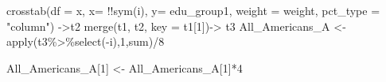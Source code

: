 \documentclass[
]{article}
\newenvironment{Shaded}{\begin{snugshade}}{\end{snugshade}}
\newcommand{\AttributeTok}[1]{\textcolor[rgb]{0.77,0.63,0.00}{#1}}
\newcommand{\DecValTok}[1]{\textcolor[rgb]{0.00,0.00,0.81}{#1}}
\newcommand{\FunctionTok}[1]{\textcolor[rgb]{0.00,0.00,0.00}{#1}}
\newcommand{\NormalTok}[1]{#1}
\newcommand{\OtherTok}[1]{\textcolor[rgb]{0.56,0.35,0.01}{#1}}
\newcommand{\SpecialCharTok}[1]{\textcolor[rgb]{0.00,0.00,0.00}{#1}}
\newcommand{\StringTok}[1]{\textcolor[rgb]{0.31,0.60,0.02}{#1}}
\begin{document}
\begin{Shaded}
\begin{Highlighting}[]
  \FunctionTok{crosstab}\NormalTok{(}\AttributeTok{df =}\NormalTok{ x, }\AttributeTok{x=} \SpecialCharTok{!!}\FunctionTok{sym}\NormalTok{(i), }\AttributeTok{y=}\NormalTok{ edu\_group1, }\AttributeTok{weight =}\NormalTok{ weight, }\AttributeTok{pct\_type =} \StringTok{"column"}\NormalTok{) }\OtherTok{{-}\textgreater{}}\NormalTok{t2}
\FunctionTok{merge}\NormalTok{(t1, t2, }\AttributeTok{key =}\NormalTok{ t1[}\DecValTok{1}\NormalTok{])}\OtherTok{{-}\textgreater{}}\NormalTok{ t3}
\NormalTok{All\_Americans\_A }\OtherTok{\textless{}{-}} \FunctionTok{apply}\NormalTok{(t3}\SpecialCharTok{\%\textgreater{}\%}\FunctionTok{select}\NormalTok{(}\SpecialCharTok{{-}}\NormalTok{i),}\DecValTok{1}\NormalTok{,sum)}\SpecialCharTok{/}\DecValTok{8}

\NormalTok{All\_Americans\_A[}\DecValTok{1}\NormalTok{] }\OtherTok{\textless{}{-}}\NormalTok{ All\_Americans\_A[}\DecValTok{1}\NormalTok{]}\SpecialCharTok{*}\DecValTok{4}


\end{Highlighting}
\end{Shaded}
\end{document}
